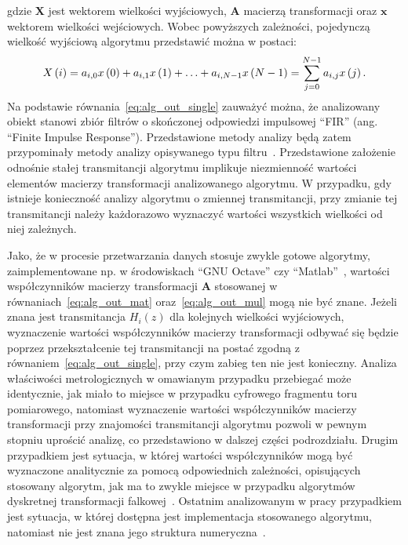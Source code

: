 gdzie $\mathbf{X}$ jest wektorem wielkości wyjściowych, $\mathbf{A}$ macierzą transformacji oraz $\mathbf{x}$ wektorem wielkości wejściowych. Wobec powyższych zależności, pojedynczą wielkość wyjściową algorytmu przedstawić można w postaci:
\begin{equation}
X \left(i\right) = a_{i, 0} x \left(0\right) + a_{i, 1} x \left(1\right) + \hdots + a_{i, N-1} x \left(N-1\right) = \sum _{j = 0} ^{N-1} a_{i,j} x \left(j\right) \label{eq:alg_out_single}.
\end{equation}
Na podstawie równania~\eqref{eq:alg_out_single} zauważyć można, że analizowany obiekt stanowi zbiór filtrów o skończonej odpowiedzi impulsowej \enquote{FIR} (ang. \enquote{Finite Impulse Response}). Przedstawione metody analizy będą zatem przypominały metody analizy opisywanego typu filtru~\cite{mehrnia_fir}. Przedstawione założenie odnośnie stałej transmitancji algorytmu implikuje niezmienność wartości elementów macierzy transformacji analizowanego algorytmu. W przypadku, gdy istnieje konieczność analizy algorytmu o zmiennej transmitancji, przy zmianie tej transmitancji należy każdorazowo wyznaczyć wartości wszystkich wielkości od niej zależnych.

Jako, że w procesie przetwarzania danych stosuje zwykle gotowe algorytmy, zaimplementowane np. w środowiskach \enquote{GNU Octave} czy \enquote{Matlab}~\cite{pruuvsa_dwt, lee_pywavelets}, wartości współczynników macierzy transformacji $\mathbf{A}$ stosowanej w równaniach~\eqref{eq:alg_out_mat} oraz~\eqref{eq:alg_out_mul} mogą nie być znane. Jeżeli znana jest transmitancja $H_{i}(z)$ dla kolejnych wielkości wyjściowych, wyznaczenie wartości współczynników macierzy transformacji odbywać się będzie poprzez przekształcenie tej transmitancji na postać zgodną z równaniem~\eqref{eq:alg_out_single}, przy czym zabieg ten nie jest konieczny. Analiza właściwości metrologicznych w omawianym przypadku przebiegać może identycznie, jak miało to miejsce w przypadku cyfrowego fragmentu toru pomiarowego, natomiast wyznaczenie wartości współczynników macierzy transformacji przy znajomości transmitancji algorytmu pozwoli w pewnym stopniu uprościć analizę, co przedstawiono w dalszej części podrozdziału. Drugim przypadkiem jest sytuacja, w której wartości współczynników mogą być wyznaczone analitycznie za pomocą odpowiednich zależności, opisujących stosowany algorytm, jak ma to zwykle miejsce w przypadku algorytmów dyskretnej transformacji falkowej~\cite{vonesch_dbbasics}. Ostatnim analizowanym w pracy przypadkiem jest sytuacja, w której dostępna jest implementacja stosowanego algorytmu, natomiast nie jest znana jego struktura numeryczna~\cite{misiti_matlabwav}.

